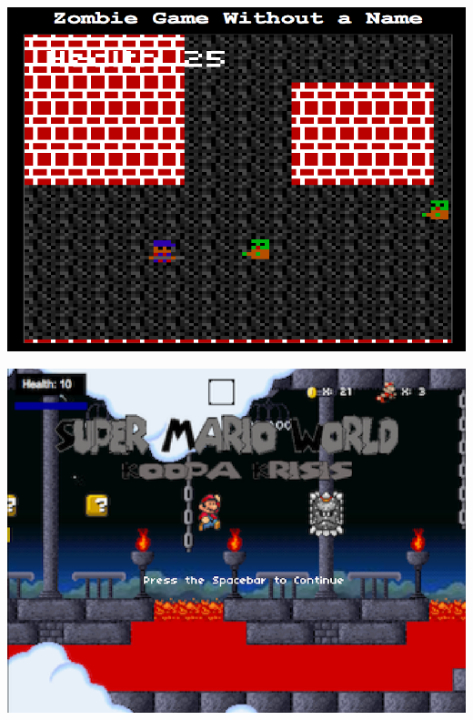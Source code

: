 \documentclass[red]{beamer}
\begin{document}
\begin{frame}
\includegraphics[height=0.9\textheight]{zombie.png}
\end{frame}

\begin{frame}
\includegraphics[height=0.9\textheight]{titlescreen.png}
\end{frame}
\end{document}
